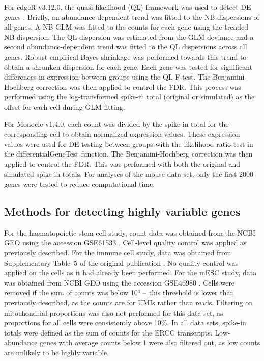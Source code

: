 \documentclass{article}
\begin{document}
For edgeR v3.12.0, the quasi-likelihood (QL) framework was used to detect DE genes \cite{lund2012detecting}.
Briefly, an abundance-dependent trend was fitted to the NB dispersions of all genes.
A NB GLM was fitted to the counts for each gene using the trended NB dispersion.
The QL dispersion was estimated from the GLM deviance and a second abundance-dependent trend was fitted to the QL dispersions across all genes.
Robust empirical Bayes shrinkage was performed towards this trend to obtain a shrunken dispersion for each gene.
Each gene was tested for significant differences in expression between groups using the QL F-test.
The Benjamini-Hochberg correction was then applied to control the FDR.
This process was performed using the log-transformed spike-in total (original or simulated) as the offset for each cell during GLM fitting.

For Monocle v1.4.0, each count was divided by the spike-in total for the corresponding cell to obtain normalized expression values.
These expression values were used for DE testing between groups with the likelihood ratio test in the differentialGeneTest function.
The Benjamini-Hochberg correction was then applied to control the FDR.
This was performed with both the original and simulated spike-in totals.
For analyses of the mouse data set, only the first 2000 genes were tested to reduce computational time.

\subsection{Methods for detecting highly variable genes}
For the haematopoietic stem cell study, count data was obtained from the NCBI GEO using the accession GSE61533 \cite{wilson2015combined}.
Cell-level quality control was applied as previously described.
For the immune cell study, data was obtained from Supplementary Table~5 of the original publication \cite{brennecke2013accounting}.
No quality control was applied on the cells as it had already been performed.
For the mESC study, data was obtained from NCBI GEO using the accession GSE46980 \cite{islam2014quantitative}.
Cells were removed if the sum of counts was below 10$^4$ -- this threshold is lower than previously described, as the counts are for UMIs rather than reads.
Filtering on mitochondrial proportions was also not performed for this data set, as proportions for all cells were consistently above 10\%.
In all data sets, spike-in totals were defined as the sum of counts for the ERCC transcripts.
Low-abundance genes with average counts below 1 were also filtered out, as low counts are unlikely to be highly variable.
\end{document}
